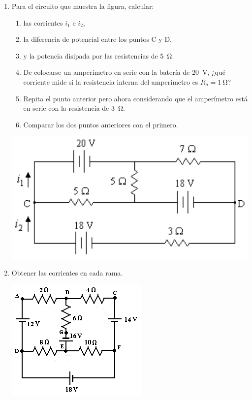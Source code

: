 \documentclass[11pt,spanish,a4paper]{article}
\begin{document}
\begin{enumerate}
	\item \begin{minipage}[t]{0.6\textwidth}
		Para el circuito que muestra la figura, calcular:
		\begin{enumerate}
			\item las corrientes \(i_1\) e \(i_2\),
			\item la diferencia de potencial entre los puntos C y D,
			\item y la potencia disipada por las resistencias de \SI{5}{\ohm}.
			\item De colocarse un amperímetro en serie con la batería de \SI{20}{\volt}, ¿qué corriente mide si la resistencia interna del amperímetro es \(R_a = \SI{1}{\ohm}\)?
			\item Repita el punto anterior pero ahora considerando que el amperímetro está en serie con la resistencia de \SI{3}{\ohm}.
			\item Comparar los dos puntos anteriores con el primero.
		\end{enumerate}
    \end{minipage}
    \begin{minipage}[c][1em][t]{0.35\textwidth}
            \includegraphics[width=\textwidth]{p3e03}
    \end{minipage}

\item Obtener las corrientes en cada rama.

    \begin{center}
    \includegraphics[width=0.45 \textwidth]{kirchhoff}
    \end{center}



\end{enumerate}
\end{document}
